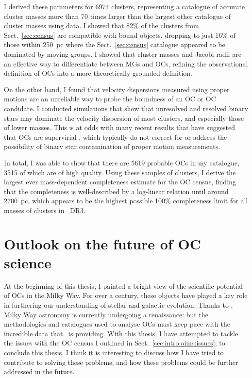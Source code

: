 I derived these parameters for 6974 clusters, representing a catalogue of accurate cluster masses more than 70 times larger than the largest other catalogue of cluster masses using \gaia data. I showed that 82\% of the clusters from Sect.~\ref{sec:census} are compatible with bound objects, dropping to just 16\% of those within 250~pc where the Sect.~\ref{sec:census} catalogue appeared to be dominated by moving groups. I showed that cluster masses and Jacobi radii are an effective way to differentiate between MGs and OCs, refining the observational definition of OCs into a more theoretically grounded definition.

On the other hand, I found that velocity dispersions measured using proper motions are an unreliable way to probe the boundness of an OC or OC candidate. I conducted simulations that show that unresolved and resolved binary stars may dominate the velocity dispersion of most clusters, and especially those of lower masses. This is at odds with many recent results that have suggested that OCs are supervirial \citep[e.g.][]{bravi_gaia-eso_2018,kuhn_kinematics_2019,pang_3d_2021}, which typically do not correct for or address the possibility of binary star contamination of proper motion measurements.

In total, I was able to show that there are 5619 probable OCs in my catalogue, 3515 of which are of high quality. Using these samples of clusters, I derive the largest ever mass-dependent completeness estimate for the OC census, finding that the completeness is well-described by a log-linear relation until around 2700~pc, which appears to be the highest possible 100\% completeness limit for all masses of clusters in \gaia\ DR3.


\section{Outlook on the future of OC science}

At the beginning of this thesis, I painted a bright view of the scientific potential of OCs in the Milky Way. For over a century, these objects have played a key role in furthering our understanding of stellar and galactic evolution. Thanks to \gaia, Milky Way astronomy is currently undergoing a renaissance: but the methodologies and catalogues used to analyse OCs must keep pace with the incredible data that \gaia\ is providing. With this thesis, I have attempted to tackle the issues with the OC census I outlined in Sect.~\ref{sec:intro:aims:issues}; to conclude this thesis, I think it is interesting to discuss how I have tried to contribute to solving these problems, and how these problems could be further addressed in the future.

